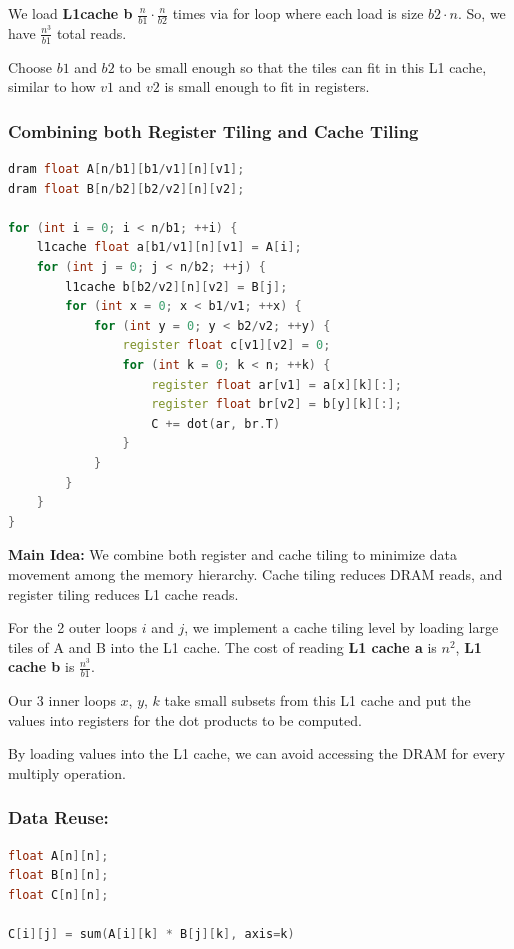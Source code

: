 \documentclass[twoside]{article}
\begin{document}
We load \textbf{L1cache b} $\frac{n}{b1} \cdot \frac{n}{b2}$ times via for loop where each load is size $b2\cdot n$. So, we have $\frac{n^3}{b1}$ total reads.

Choose $b1$ and $b2$ to be small enough so that the tiles can fit in this L1 cache, similar to how $v1$ and $v2$ is small enough to fit in registers.



\subsubsection{Combining both Register Tiling and Cache Tiling}

\begin{lstlisting}[language=C++]
dram float A[n/b1][b1/v1][n][v1];
dram float B[n/b2][b2/v2][n][v2];

for (int i = 0; i < n/b1; ++i) {
    l1cache float a[b1/v1][n][v1] = A[i];
    for (int j = 0; j < n/b2; ++j) {
        l1cache b[b2/v2][n][v2] = B[j];
        for (int x = 0; x < b1/v1; ++x) {
            for (int y = 0; y < b2/v2; ++y) {
                register float c[v1][v2] = 0;
                for (int k = 0; k < n; ++k) {
                    register float ar[v1] = a[x][k][:];
                    register float br[v2] = b[y][k][:];
                    C += dot(ar, br.T)
                }
            }
        }
    }
}
\end{lstlisting}

\textbf{Main Idea:} We combine both register and cache tiling to minimize data movement among the memory hierarchy. Cache tiling reduces DRAM reads, and register tiling reduces L1 cache reads. 

For the 2 outer loops $i$ and $j$, we implement a cache tiling level by loading large tiles of A and B into the L1 cache. The cost of reading \textbf{L1 cache a} is $n^2$, \textbf{L1 cache b} is $\frac{n^3}{b1}$.

Our 3 inner loops $x$, $y$, $k$ take small subsets from this L1 cache and put the values into registers for the dot products to be computed. 

By loading values into the L1 cache, we can avoid accessing the DRAM for every multiply operation.

\subsubsection{Data Reuse:}
\begin{lstlisting}[language=C++]
float A[n][n];
float B[n][n];
float C[n][n];

C[i][j] = sum(A[i][k] * B[j][k], axis=k)
\end{lstlisting}
\end{document}
